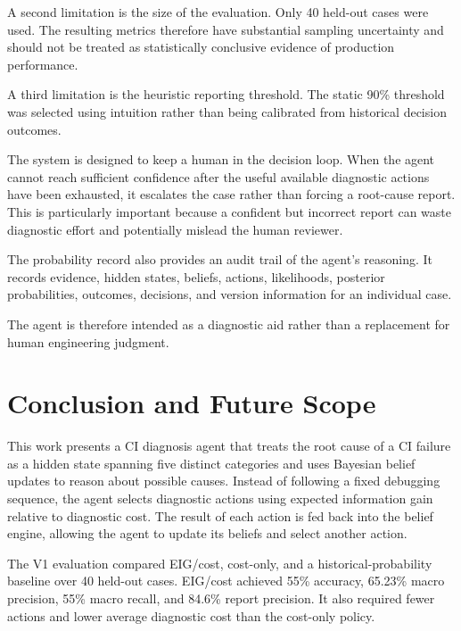 \documentclass{article}
\begin{document}
A second limitation is the size of the evaluation. Only 40 held-out cases were used. The resulting metrics therefore have substantial sampling uncertainty and should not be treated as statistically conclusive evidence of production performance.

A third limitation is the heuristic reporting threshold. The static 90\% threshold was selected using intuition rather than being calibrated from historical decision outcomes.

The system is designed to keep a human in the decision loop. When the agent cannot reach sufficient confidence after the useful available diagnostic actions have been exhausted, it escalates the case rather than forcing a root-cause report. This is particularly important because a confident but incorrect report can waste diagnostic effort and potentially mislead the human reviewer.

The probability record also provides an audit trail of the agent's reasoning. It records evidence, hidden states, beliefs, actions, likelihoods, posterior probabilities, outcomes, decisions, and version information for an individual case.

The agent is therefore intended as a diagnostic aid rather than a replacement for human engineering judgment.

\section{Conclusion and Future Scope}

This work presents a CI diagnosis agent that treats the root cause of a CI failure as a hidden state spanning five distinct categories and uses Bayesian belief updates to reason about possible causes. Instead of following a fixed debugging sequence, the agent selects diagnostic actions using expected information gain relative to diagnostic cost. The result of each action is fed back into the belief engine, allowing the agent to update its beliefs and select another action.

The V1 evaluation compared EIG/cost, cost-only, and a historical-probability baseline over 40 held-out cases. EIG/cost achieved 55\% accuracy, 65.23\% macro precision, 55\% macro recall, and 84.6\% report precision. It also required fewer actions and lower average diagnostic cost than the cost-only policy.
\end{document}
